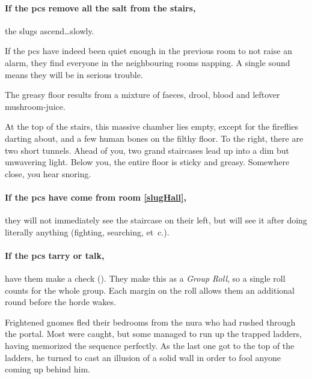 \begin{multicols}{2}
\paragraph{If the \glspl{pc} remove all the salt from the stairs,}
the slugs ascend\ldots slowly.


If the \glspl{pc} have indeed been quiet enough in the previous room to not raise an alarm, they find everyone in the neighbouring rooms napping.
A single sound means they will be in serious trouble.

The greasy floor results from a mixture of faeces, drool, blood and leftover mushroom-juice.

\begin{boxtext}
  At the top of the stairs, this massive chamber lies empty, except for the fireflies darting about, and a few human bones on the filthy floor.
  To the right, there are two short tunnels.
  Ahead of you, two grand staircases lead up into a dim but unwavering light.
  Below you, the entire floor is sticky and greasy.
  Somewhere close, you hear snoring.
\end{boxtext}

\paragraph{If the \glspl{pc} have come from room \ref{slugHall},}
they will not immediately see the staircase on their left, but will see it after doing literally anything (fighting, searching, et~c.).

\label{laddertop}

\paragraph{If the \glspl{pc} tarry or talk,}
have them make a  check (\tn[6]).
They make this as a \textit{Group Roll}, so a single roll counts for the whole group.
Each margin on the roll allows them an additional round before the horde wakes.


\begin{exampletext}

  Frightened gnomes fled their bedrooms from the nura who had rushed through the portal.
  Most were caught, but some managed to run up the trapped ladders, having memorized the sequence perfectly.
  As the last one got to the top of the ladders, he turned to cast an illusion of a solid wall in order to fool anyone coming up behind him.


\end{exampletext}
\end{multicols}
